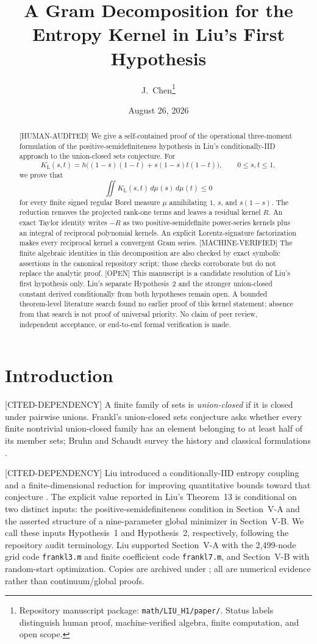 \documentclass[11pt]{article}
\title{A Gram Decomposition for the Entropy Kernel in Liu's First Hypothesis}
\author{J.\ Chen\thanks{Repository manuscript package:
\texttt{math/LIU\_H1/paper/}.  Status labels distinguish human proof,
machine-verified algebra, finite computation, and open scope.}}
\date{August 26, 2026}
\theoremstyle{plain}
\theoremstyle{definition}
\theoremstyle{remark}
\newcommand{\status}[1]{\textnormal{\textsf{\footnotesize[#1]}}}
\newcommand{\MachineVerified}{\status{MACHINE-VERIFIED}}
\newcommand{\HumanAudited}{\status{HUMAN-AUDITED}}
\newcommand{\CitedDependency}{\status{CITED-DEPENDENCY}}
\newcommand{\OpenStatus}{\status{OPEN}}
\begin{document}
\maketitle

\begin{abstract}
\HumanAudited{} We give a self-contained proof of the operational
three-moment formulation of the positive-semidefiniteness hypothesis in
Liu's conditionally-IID approach to the union-closed sets conjecture.  For
\[
  K_{\mathrm L}(s,t)
  =h\bigl((1-s)(1-t)+s(1-s)t(1-t)\bigr),
  \qquad 0\le s,t\le1,
\]
we prove that
\[
  \iint K_{\mathrm L}(s,t)\,d\mu(s)\,d\mu(t)\le0
\]
for every finite signed regular Borel measure \(\mu\) annihilating
\(1\), \(s\), and \(s(1-s)\).  The reduction removes the projected
rank-one terms and leaves a residual kernel \(R\).  An exact Taylor identity
writes \(-R\) as two positive-semidefinite power-series kernels plus an
integral of reciprocal polynomial kernels.  An explicit Lorentz-signature
factorization makes every reciprocal kernel a convergent Gram series.
\MachineVerified{} The finite algebraic identities in this decomposition are
also checked by exact symbolic assertions in the canonical repository script;
those checks corroborate but do not replace the analytic proof.
\OpenStatus{} This manuscript is a candidate resolution of Liu's first
hypothesis only.  Liu's separate Hypothesis~2 and the stronger
union-closed constant derived conditionally from both hypotheses remain open.
A bounded theorem-level literature search found no earlier proof of this
kernel statement; absence from that search is not proof of universal priority.
No claim of peer review, independent acceptance, or end-to-end formal
verification is made.
\end{abstract}

\section{Introduction}
\label{sec:introduction}

\CitedDependency{} A finite family of sets is \emph{union-closed} if it is
closed under pairwise unions.  Frankl's union-closed sets conjecture asks
whether every finite nontrivial union-closed family has an element belonging
to at least half of its member sets; Bruhn and Schaudt survey the history and
classical formulations \cite{bruhn-schaudt}.

\CitedDependency{} Liu introduced a conditionally-IID entropy coupling and a
finite-dimensional reduction for improving quantitative bounds toward that
conjecture \cite{liu}.  The explicit value reported in Liu's Theorem~13 is
conditional on two distinct inputs: the positive-semidefiniteness condition
in Section~V-A and the asserted structure of a nine-parameter global minimizer
in Section~V-B.  We call these inputs Hypothesis~1 and Hypothesis~2,
respectively, following the repository audit terminology.  Liu supported
Section~V-A with the 2,499-node grid code \texttt{frankl3.m} and finite
coefficient code \texttt{frankl7.m}, and Section~V-B with random-start
optimization.  Copies are archived under ; all are
numerical evidence rather than continuum/global proofs.
\end{document}
